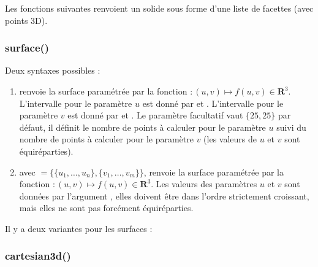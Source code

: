 Les fonctions suivantes renvoient un solide sous forme d'une liste de facettes (avec points 3D).

\subsubsection{surface()}

Deux syntaxes possibles :
\begin{enumerate}
    \item {} renvoie la surface paramétrée par la fonction $\colon(u,v) \mapsto f(u,v)\in \mathbf R^3$. L'intervalle pour le paramètre $u$ est donné par  et . L'intervalle pour le paramètre $v$ est donné par  et . Le paramètre facultatif  vaut $\{25,25\}$ par défaut, il définit le nombre de points à calculer pour le paramètre $u$ suivi du nombre de points à calculer pour le paramètre $v$ (les valeurs de $u$ et $v$ sont équiréparties).
    
    \item {} avec $=\{\{u_1,\ldots,u_n\}, \{v_1,\ldots,v_m\}\}$, renvoie la surface paramétrée par la fonction $\colon(u,v) \mapsto f(u,v)\in \mathbf R^3$. Les valeurs des paramètres $u$ et $v$ sont données par l'argument , elles doivent être dans l'ordre strictement croissant, mais elles ne sont pas forcément équiréparties.
\end{enumerate}

    
Il y a deux variantes pour les surfaces :

\subsubsection{cartesian3d()}

